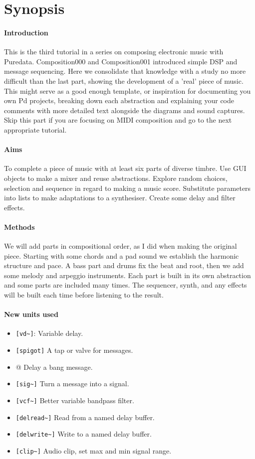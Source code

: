 \section{Synopsis}

\paragraph{Introduction}
This is the third tutorial in a series on composing electronic music with Puredata. 
Composition000 and Composition001 introduced simple DSP and message sequencing. Here
we consolidate that knowledge with a study no more difficult than the last
part, showing the development of a 'real' piece of music. This might serve as
a good enough template, or inspiration for documenting you own Pd projects, breaking
down each abstraction and explaining your code comments with more detailed text
alongside the diagrams and sound captures. Skip this part if you are focusing on
MIDI composition and go to the next appropriate tutorial. 



\paragraph{Aims}
To complete a piece of music with at least six parts of diverse timbre. Use GUI objects to
make a mixer and reuse abstractions. Explore random choices, selection and sequence in
regard to making a music score. Substitute parameters into lists to make adaptations
to a synthesiser. Create some delay and filter effects.

\paragraph{Methods}
We will add parts in compositional order, as I did when making the original piece.
Starting with some chords and a pad sound we establish the harmonic structure and pace.
A bass part and drums fix the beat and root, then we add some melody and arpeggio
instruments. Each part is built in its own abstraction and some parts are included
many times. The sequencer, synth, and any effects will be built each time before
listening to the result.

\paragraph{New units used}
\begin{itemize}
\item \verb+[vd~]+: Variable delay.
\item \verb+[spigot]+ A tap or valve for messages.
\item \verb@[del]@ Delay a bang message.
\item \verb+[sig~]+ Turn a message into a signal.
\item \verb+[vcf~]+ Better variable bandpass filter.
\item \verb+[delread~]+ Read from a named delay buffer.
\item \verb+[delwrite~]+ Write to a named delay buffer.
\item \verb+[clip~]+ Audio clip, set max and min signal range.
\end{itemize} 